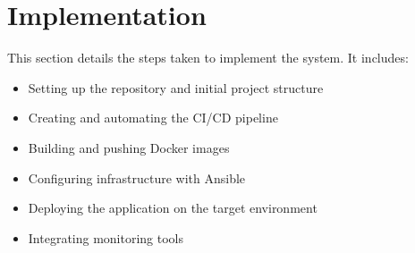 \documentclass[12pt]{article}
\begin{document}
\section{Implementation}
This section details the steps taken to implement the system. It includes:
\begin{itemize}
    \item Setting up the repository and initial project structure
    \item Creating and automating the CI/CD pipeline
    \item Building and pushing Docker images
    \item Configuring infrastructure with Ansible
    \item Deploying the application on the target environment
    \item Integrating monitoring tools
\end{itemize}


\end{document}
